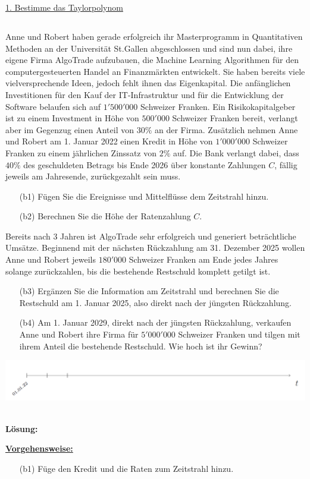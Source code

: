 \underline{1. Bestimme das Taylorpolynom}\\

\newpage
\subsection*{}
Anne und Robert haben gerade erfolgreich ihr Masterprogramm in Quantitativen
Methoden an der Universität St.Gallen abgeschlossen und sind nun dabei, ihre eigene
Firma AlgoTrade aufzubauen, die Machine Learning Algorithmen für den computergesteuerten Handel an Finanzmärkten entwickelt. Sie haben bereits viele vielversprechende Ideen, jedoch fehlt ihnen das Eigenkapital. Die anfänglichen Investitionen für den Kauf der IT-Infrastruktur und für die Entwicklung der Software belaufen sich auf $1'500'000$ Schweizer Franken.
Ein Risikokapitalgeber ist zu einem Investment in Höhe von $500'000$ Schweizer Franken bereit, verlangt aber im Gegenzug einen Anteil von $30 \%$ an der Firma.
Zusätzlich nehmen Anne und Robert am 1. Januar 2022 einen Kredit in Höhe von $1'000'000$ Schweizer Franken zu einem jährlichen Zinssatz von $2 \% $ auf.
Die Bank verlangt dabei, dass $40 \%$ des geschuldeten Betrags bis Ende 2026 über konstante Zahlungen $C$, fällig jeweils am Jahresende, zurückgezahlt sein muss.
\begin{enumerate}
	\item[(b1)] Fügen Sie die Ereignisse und Mittelflüsse dem Zeitstrahl hinzu.
	\item[(b2)] Berechnen Sie die Höhe der Ratenzahlung $C$.
\end{enumerate}
Bereits nach 3 Jahren ist AlgoTrade sehr erfolgreich und generiert beträchtliche Umsätze. Beginnend mit der nächsten Rückzahlung am 31. Dezember 2025 wollen Anne und Robert jeweils $180'000$ Schweizer Franken am Ende jedes Jahres solange zurückzahlen, bis die bestehende Restschuld komplett getilgt ist.
\begin{enumerate}
	\item[(b3)] Ergänzen Sie die Information am Zeitstrahl und berechnen Sie die Restschuld am 1. Januar 2025, also direkt nach der jüngsten Rückzahlung.
	\item[(b4)] Am 1. Januar 2029, direkt nach der jüngsten Rückzahlung, verkaufen Anne und Robert	ihre Firma für $5'000'000$ Schweizer Franken und tilgen mit ihrem Anteil die bestehende	Restschuld. Wie hoch ist ihr Gewinn?
\end{enumerate}
\begin{center}
	\includegraphics[scale=0.45]{pictures/zeitstrahl_1_b}
\end{center}
\ \\
\textbf{Lösung:}
\begin{mdframed}
\underline{\textbf{Vorgehensweise:}}
\begin{enumerate}
\item[(b1)] Füge den Kredit und die Raten zum Zeitstrahl hinzu.
\end{enumerate}
\end{mdframed}

